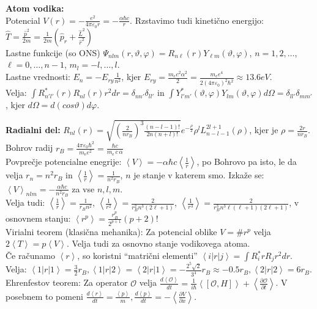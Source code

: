 \documentclass[a4paper, oneside, 12pt]{article}
\theoremstyle{definition}
\newcommand{\eps}{\varepsilon}
\begin{document}
\textbf{Atom vodika:} \\
Potencial $V(r) = -\frac{e^2}{4\pi\eps_0r} = - \frac{\alpha \hbar c}{r}$. Rzstavimo tudi kinetično energijo:
$\hat{T} = \frac{\hat{p}^2}{2m} = \frac{1}{2m}(\hat{p}_r + \frac{\hat{L}^2}{\hat{r}^2})$ \\
Lastne funkcije (so ONS) $\Psi_{nlm}(r,\vartheta, \varphi) = R_{n\ell}(r) Y_{\ell m}(\vartheta, \varphi)$, $n = 1, 2, \ldots$, $\ell = 0, \ldots, n-1$, $m_l = -l, \ldots, l$. \\
Lastne  vrednosti: $E_n = - E_{ry} \frac{1}{n^2}$, kjer $E_{ry} = \frac{m_e c^2 \alpha^2}{2} = \frac{ m_e e^4}{2 ( 4 \pi \eps_0)^2 \hbar^2 } \approx 13.6 eV$.\\
Velja: $\int R_{n' l'}^*(r) R_{nl}(r) r^2 dr = \delta_{n n'} \delta_{l l'}$ in $\int Y_{l' m'}^*(\vartheta, \varphi) Y_{lm}(\vartheta, \varphi) d\Omega = \delta_{l l'} \delta_{m m'}$, kjer $d\Omega = d(cos\vartheta) d\varphi$.

\textbf{Radialni del:} $R_{n l}(r) = \sqrt{(\frac{2}{n r_B})^3 \frac{(n-l-1)!}{2n(n+l)!}} e^{-\frac{\rho}{2}} \rho^l L_{n-l-1}^{2l+1}(\rho)$, kjer je $\rho = \frac{2r}{n r_B}$.\\
Bohrov radij $r_B = \frac{4 \pi \varepsilon_0 \hbar^2}{m_{\mathrm{e}} e^2} =
\frac{\hbar c}{m_{\mathrm{e}}\,c\,\alpha}$\\
Povprečje potencialne enegrije: $\left\langle V\right\rangle = - \alpha \hbar c \left\langle \frac{1}{r}\right\rangle$, po Bohrovo pa isto, le da velja $r_n = n^2 r_B$ in $\left\langle \frac{1}{r}\right\rangle = \frac{1}{n^2 r_B}$, $n$ je stanje v katerem smo. Izkaže se: $\left\langle V\right\rangle_{nlm} = -\frac{\alpha \hbar c}{n^2 r_B}$ za vse $n,l,m$.\\
Velja tudi:
$\left\langle \frac{1}{r}\right\rangle = \frac{1}{r_Bn^2}$,
$\left\langle \frac{1}{r^2}\right\rangle = \frac{2}{r_B^2n^3(2\ell+1)}$,
$\left\langle \frac{1}{r^3}\right\rangle = \frac{2}{r_B^3n^3\ell(\ell+1)(2\ell+1)}$,
v osnovnem stanju: $\left\langle r^p\right\rangle = \frac{r_B^p}{2^{p+1}} (p+2)!$\\
Virialni teorem (klasična mehanika): Za potencial oblike $V = \# r^p$ velja $2 \left\langle T\right\rangle = p \left\langle V\right\rangle$. Velja tudi za osnovno stanje vodikovega atoma.\\
Če računamo $\left\langle r\right\rangle$, so koristni ``matrični elementi'' $\left\langle i|r|j\right\rangle = \int R_i^* r R_j r^2 dr$. Velja: $\left\langle 1|r|1\right\rangle = \frac{3}{2}r_B, \left\langle 1|r|2\right\rangle = \left\langle 2|r|1\right\rangle = - \frac{2^5 \sqrt{2}}{3^4} r_B \approx - 0.5 r_B, \left\langle 2|r|2\right\rangle = 6 r_B$.\\
Ehrenfestov teorem: Za operator $\mathcal{O}$ velja $\frac{d \left\langle \mathcal{O}\right\rangle}{dt} = \frac{1}{i\hbar} \left\langle [\mathcal{O}, H]\right\rangle + \left\langle \frac{\partial \mathcal{O}}{\partial t}\right\rangle$. V posebnem to pomeni $\frac{d\left\langle r\right\rangle}{dt} = \frac{\left\langle p\right\rangle}{m}, \frac{d \left\langle p\right\rangle}{dt} = -\left\langle \frac{\partial V}{\partial x}\right\rangle$.
\end{document}
